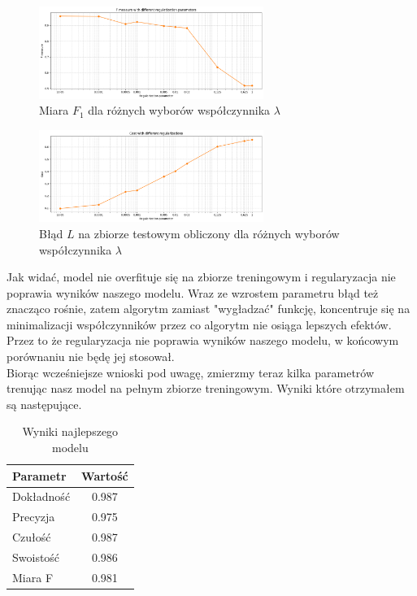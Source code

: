 \documentclass[polish,12pt,a4paper]{extarticle}
\begin{document}
\begin{figure}[h!]
    \centering
    \includegraphics[width=0.65\textwidth]{img/reg_f.png}
    \caption{Miara $F_1$ dla różnych wyborów współczynnika $\lambda$}
\end{figure}
\begin{figure}[h!]
    \centering
    \includegraphics[width=0.65\textwidth]{img/reg_cost.png}
    \caption{Błąd $L$ na zbiorze testowym obliczony dla różnych wyborów współczynnika $\lambda$} \end{figure} \FloatBarrier
Jak widać, model nie overfituje się na zbiorze treningowym i regularyzacja nie poprawia wyników naszego modelu. Wraz ze wzrostem parametru błąd też znacząco rośnie, zatem algorytm zamiast "wygładzać" funkcję, koncentruje się na minimalizacji współczynników przez co algorytm nie osiąga lepszych efektów. Przez to że regularyzacja nie poprawia wyników naszego modelu, w końcowym porównaniu nie będę jej stosował. \smallskip \\
Biorąc wcześniejsze wnioski pod uwagę, zmierzmy teraz kilka parametrów trenując nasz model na pełnym zbiorze treningowym. Wyniki które otrzymałem są następujące.
\begin{table}[h!]
\centering
\begin{tabular}{|l|c|}
\hline
\textbf{Parametr}       & \textbf{Wartość} \\
\hline
Dokładność              & 0.987          \\
Precyzja             & 0.975          \\
Czułość           & 0.987          \\
Swoistość           & 0.986          \\
Miara F             & 0.981          \\
\hline
\end{tabular}
\caption{Wyniki najlepszego modelu}
\label{tab:performance_metrics}
\end{table} \FloatBarrier
\end{document}
